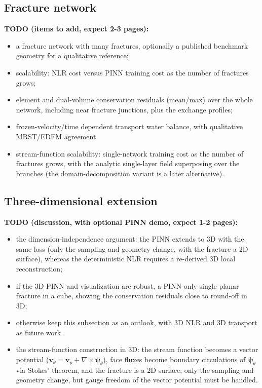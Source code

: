 \documentclass[a4paper,fleqn]{cas-sc}
\newcommand{\vflux}{\mathbf{v}}
\newcommand{\vp}{\vflux_{p}}              %
\begin{document}
\subsection{Fracture network}
\label{subsec:fracture-network}

{\color{red}
\noindent\textbf{TODO (items to add, expect 2-3 pages):}
\begin{itemize}
\item a fracture network with many fractures, optionally a published benchmark geometry for a qualitative reference;
\item scalability: NLR cost versus PINN training cost as the number of fractures grows;
\item element and dual-volume conservation residuals (mean/max) over the whole network, including near fracture junctions, plus the exchange profiles;
\item frozen-velocity/time dependent transport water balance, with qualitative MRST/EDFM agreement.
\item stream-function scalability: single-network training cost as the number of fractures grows, with the analytic single-layer field superposing over the branches (the domain-decomposition variant is a later alternative).
\end{itemize}
}

\subsection{Three-dimensional extension}
\label{subsec:three-dimensional}

{\color{red}
\noindent\textbf{TODO (discussion, with optional PINN demo, expect 1-2 pages):}
\begin{itemize}
\item the dimension-independence argument: the PINN extends to 3D with the same loss (only the sampling and geometry change, with the fracture a 2D surface), whereas the deterministic NLR requires a re-derived 3D local reconstruction;
\item if the 3D PINN and visualization are robust, a PINN-only single planar fracture in a cube, showing the conservation residuals close to round-off in 3D;
\item otherwise keep this subsection as an outlook, with 3D NLR and 3D transport as future work.
\item the stream-function construction in 3D: the stream function becomes a vector potential (\(\vflux_\theta=\vp+\nabla\times\bm\psi_\theta\)), face fluxes become boundary circulations of \(\bm\psi_\theta\) via Stokes' theorem, and the fracture is a 2D surface; only the sampling and geometry change, but gauge freedom of the vector potential must be handled.
\end{itemize}
}
\end{document}
